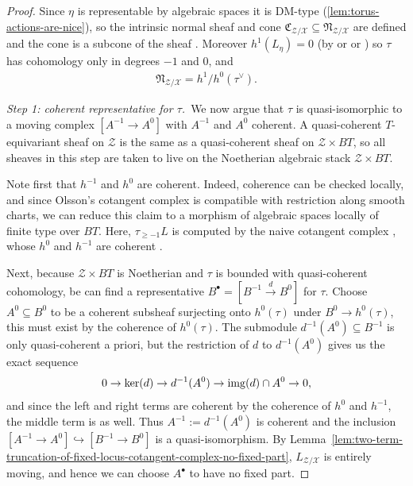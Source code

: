 \documentclass[12pt,dvipsnames]{amsart}
\begin{document}
\begin{proof} 
  Since \(\eta\) is representable by algebraic spaces it is DM-type (\ref{lem:torus-actions-are-nice}), so the intrinsic normal sheaf and cone \(\mathfrak C_{\mathcal Z/\mathcal X}\subseteq \mathfrak N_{\mathcal Z/\mathcal X}\) are defined and the cone is a subcone of the sheaf \cite[Prop. 2.33]{manolache_VirtualPullbacks2012}. Moreover \(h^1(L_\eta) = 0\) (by \cite[Remark 2.3]{manolache_VirtualPullbacks2012} or \cite[Proposition 2.24]{aranha-pstragowski_IntrinsicNormalCone2024} or \cite[Prop. 2.24]{aranha-pstragowski_IntrinsicNormalCone2024}) so \(\tau\) has cohomology only in degrees \(-1\) and \(0\), and
  \begin{align*}
    \mathfrak N_{\mathcal Z/\mathcal X} = h^1/h^0(\tau^\vee).
  \end{align*}

  \bigskip
  
  \noindent\emph{Step 1: coherent representative for \(\tau\).}~We now argue that \(\tau\) is quasi-isomorphic to a moving complex \([A^{-1}\to A^0]\) with \(A^{-1}\) and \(A^0\) coherent. A quasi-coherent \(T\)-equivariant sheaf on \(\mathcal Z\) is the same as a quasi-coherent sheaf on \(\mathcal Z\times BT\), so all sheaves in this step are taken to live on the Noetherian algebraic stack \(\mathcal Z\times BT\).
  
  Note first that \(h^{-1}\) and \(h^0\) are coherent. Indeed, coherence can be checked locally, and since Olsson's cotangent complex is compatible with restriction along smooth charts, we can reduce this claim to a morphism of algebraic spaces locally of finite type over \(BT\). Here, \(\tau_{\geq -1}L\) is computed by the naive cotangent complex \cite[08RB]{stacks-project}, whose \(h^0\) and \(h^{-1}\) are coherent \cite[0D0U]{stacks-project}.

  Next, because \(\mathcal Z\times BT\) is Noetherian and \(\tau\) is bounded with quasi-coherent cohomology, be can find a representative \(B^\bullet = [B^{-1}\xrightarrow{d} B^0]\) for \(\tau\). Choose \(A^0 \subseteq B^0\) to be a coherent subsheaf surjecting onto \(h^0(\tau)\) under \(B^0\to h^0(\tau)\), this must exist by the coherence of \(h^0(\tau)\). The submodule \(d^{-1}(A^0)\subseteq B^{-1}\) is only quasi-coherent a priori, but the restriction of \(d\) to \(d^{-1}(A^0)\) gives us the exact sequence
  \begin{align*}
    0 \to \ker(d) \to d^{-1}(A^0) \to \operatorname{img}(d)\cap A^0 \to 0,
  \end{align*}
  and since the left and right terms are coherent by the coherence of \(h^0\) and \(h^{-1}\), the middle term is as well. Thus \(A^{-1}:= d^{-1}(A^0)\) is coherent and the inclusion \([A^{-1}\to A^0]\hookrightarrow [B^{-1}\to B^0]\) is a quasi-isomorphism. By Lemma~\ref{lem:two-term-truncation-of-fixed-locus-cotangent-complex-no-fixed-part}, \(L_{\mathcal Z/\mathcal X}\) is entirely moving, and hence we can choose \(A^\bullet\) to have no fixed part.


\end{proof}
\end{document}
